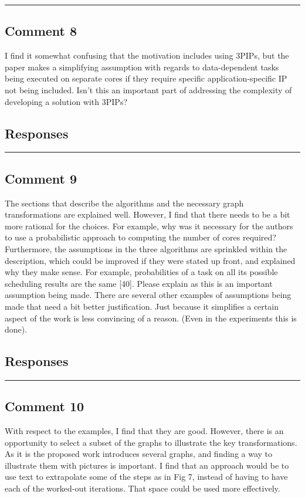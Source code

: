 \documentclass[10pt,journal, compsoc]{IEEEtran}
\begin{document}
\noindent\rule[0.25\baselineskip]{252pt}{1pt}

\subsection*{Comment 8}
I find it somewhat confusing that the motivation includes using 3PIPs, but the paper makes a simplifying assumption with regards to data-dependent tasks being executed on separate cores if they require specific application-specific IP not being included. Isn’t this an important part of addressing the complexity of developing a solution with 3PIPs?

\subsection*{Responses}


\noindent\rule[0.25\baselineskip]{252pt}{1pt}

\subsection*{Comment 9}
The sections that describe the algorithms and the necessary graph transformations are explained well. However, I find that there needs to be a bit more rational for the choices. For example, why was it necessary for the authors to use a probabilistic approach to computing the number of cores required? Furthermore, the assumptions in the three algorithms are sprinkled within the description, which could be improved if they were stated up front, and explained why they make sense. For example, probabilities of a task on all its possible scheduling results are the same [40]. Please explain as this is an important assumption being made. There are several other examples of assumptions being made that need a bit better justification. Just because it simplifies a certain aspect of the work is less convincing of a reason.  (Even in the experiments this is done).

\subsection*{Responses}


\noindent\rule[0.25\baselineskip]{252pt}{1pt}

\subsection*{Comment 10}
With respect to the examples, I find that they are good. However, there is an opportunity to select a subset of the graphs to illustrate the key transformations. As it is the proposed work introduces several graphs, and finding a way to illustrate them with pictures is important. I find that an approach would be to use text to extrapolate some of the steps as in Fig 7, instead of having to have each of the worked-out iterations. That space could be used more effectively.
\end{document}
